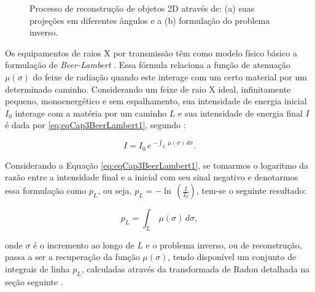 
\begin{figure}[H]
	\centering
	
	\caption{Processo de reconstrução de objetos \acs{2D} através de: (a) suas projeções em diferentes ângulos e a (b) formulação do problema inverso.}
	
	\hfill
	
	\label{fig:imgCap3ProbInver}
\end{figure}

Os equipamentos de raios X por transmissão têm como modelo físico básico a formulação de \textit{Beer-Lambert} \cite{zeng2010medical}. Essa fórmula relaciona a função de atenuação $\mu(\sigma)$ do feixe de radiação quando este interage com um certo material por um determinado caminho. Considerando um feixe de raio X ideal, infinitamente pequeno, monoenergético e sem espalhamento, sua intensidade de energia inicial $I_{0}$ interage com a matéria por um caminho $L$ e sua intensidade de energia final $I$ é dada por \eqref{eq:eqCap3BeerLambert1}, segundo :

\begin{equation}
 I = I_{0} \, e \, ^{-\int_{L}^{} \,\mu(\sigma) \, d\sigma}.
\label{eq:eqCap3BeerLambert1}
\end{equation}

Considerando a Equação \ref{eq:eqCap3BeerLambert1}, se tomarmos o logaritmo da razão entre a intensidade final e a inicial com seu sinal negativo e denotarmos essa formulação como $p_{L}$, ou seja, $p_{L} = -\ln \, \left(\frac{I}{I_{0}}\right)$, tem-se o seguinte resultado:

\begin{equation}
p_{L} = {\int_{L}^{} \,\mu(\sigma) \, d\sigma},
\label{eq:eqCap3BeerLambert2}
\end{equation}

\noindent onde $\sigma$ é o incremento ao longo de $L$ e o problema inverso, ou de reconstrução, passa a ser a recuperação da função  $\mu(\sigma)$, tendo disponível um conjunto de integrais de linha $p_{L}$, calculadas através da transformada de Radon detalhada na seção seguinte \cite[p. 33]{levakhina2014three}.  
 
